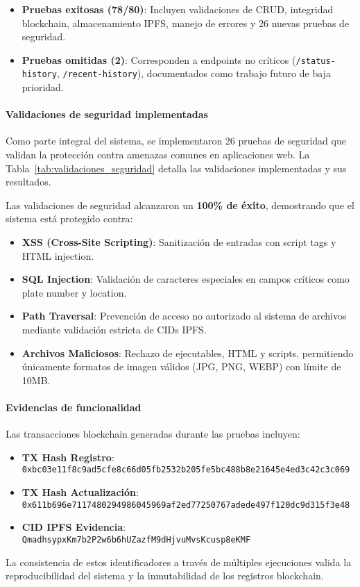 \begin{itemize}
    \item \textbf{Pruebas exitosas (78/80)}: Incluyen validaciones de CRUD, integridad blockchain, almacenamiento IPFS, manejo de errores y 26 nuevas pruebas de seguridad.
    \item \textbf{Pruebas omitidas (2)}: Corresponden a endpoints no críticos (\texttt{/status-history}, \texttt{/recent-history}), documentados como trabajo futuro de baja prioridad.
\end{itemize}

\paragraph{Validaciones de seguridad implementadas}
Como parte integral del sistema, se implementaron 26 pruebas de seguridad que validan la protección contra amenazas comunes en aplicaciones web. La Tabla~\ref{tab:validaciones_seguridad} detalla las validaciones implementadas y sus resultados.



Las validaciones de seguridad alcanzaron un \textbf{100\% de éxito}, demostrando que el sistema está protegido contra:

\begin{itemize}
    \item \textbf{XSS (Cross-Site Scripting)}: Sanitización de entradas con script tags y HTML injection.
    \item \textbf{SQL Injection}: Validación de caracteres especiales en campos críticos como plate number y location.
    \item \textbf{Path Traversal}: Prevención de acceso no autorizado al sistema de archivos mediante validación estricta de CIDs IPFS.
    \item \textbf{Archivos Maliciosos}: Rechazo de ejecutables, HTML y scripts, permitiendo únicamente formatos de imagen válidos (JPG, PNG, WEBP) con límite de 10MB.
\end{itemize}

\paragraph{Evidencias de funcionalidad}
Las transacciones blockchain generadas durante las pruebas incluyen:

\begin{itemize}
    \item \textbf{TX Hash Registro}: \texttt{0xbc03e11f8c9ad5cfe8c66d05fb2532b205fe5bc488b8e21645e4ed3c42c3c069}
    \item \textbf{TX Hash Actualización}: \texttt{0x611b696e7117480294986045969af2ed77250767adede497f120dc9d315f3e48}
    \item \textbf{CID IPFS Evidencia}: \texttt{QmadhsypxKm7b2P2w6b6hUZazfM9dHjvuMvsKcusp8eKMF}
\end{itemize}

La consistencia de estos identificadores a través de múltiples ejecuciones valida la reproducibilidad del sistema y la inmutabilidad de los registros blockchain. 